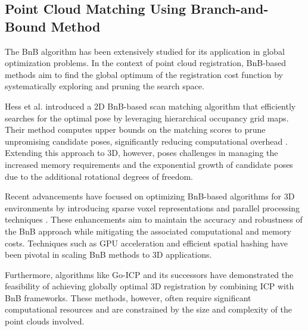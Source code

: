 \subsection{Point Cloud Matching Using Branch-and-Bound Method}
The BnB algorithm has been extensively studied for its application in global optimization problems. In the context of point cloud registration, BnB-based methods aim to find the global optimum of the registration cost function by systematically exploring and pruning the search space.

Hess et al. \cite{Hess2016} introduced a 2D BnB-based scan matching algorithm that efficiently searches for the optimal pose by leveraging hierarchical occupancy grid maps. Their method computes upper bounds on the matching scores to prune unpromising candidate poses, significantly reducing computational overhead \cite{Hess2016}. Extending this approach to 3D, however, poses challenges in managing the increased memory requirements and the exponential growth of candidate poses due to the additional rotational degrees of freedom.

Recent advancements have focused on optimizing BnB-based algorithms for 3D environments by introducing sparse voxel representations and parallel processing techniques \cite{GoICP2013}. These enhancements aim to maintain the accuracy and robustness of the BnB approach while mitigating the associated computational and memory costs. Techniques such as GPU acceleration and efficient spatial hashing \cite{Teschner2003} have been pivotal in scaling BnB methods to 3D applications.

Furthermore, algorithms like Go-ICP \cite{GoICP2013} and its successors have demonstrated the feasibility of achieving globally optimal 3D registration by combining ICP with BnB frameworks. These methods, however, often require significant computational resources and are constrained by the size and complexity of the point clouds involved.

